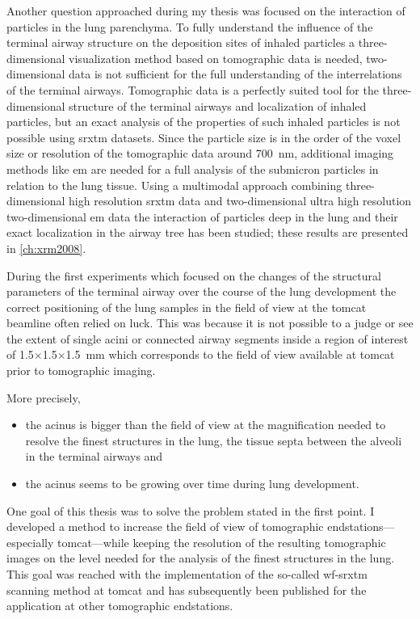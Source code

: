 Another question approached during my thesis was focused on the interaction of particles in the lung parenchyma. To fully understand the influence of the terminal airway structure on the deposition sites of inhaled particles a three-dimensional visualization method based on tomographic data is needed, two-dimensional data is not sufficient for the full understanding of the interrelations of the terminal airways. Tomographic data is a perfectly suited tool for the three-dimensional structure of the terminal airways and localization of inhaled particles, but an exact analysis of the properties of such inhaled particles is not possible using \ac{srxtm} datasets. Since the particle size is in the order of the voxel size or resolution of the tomographic data around \SI{700}{nm}, additional imaging methods like \ac{em} are needed for a full analysis of the submicron particles in relation to the lung tissue. Using a multimodal approach combining three-dimensional high resolution \ac{srxtm} data and two-dimensional ultra high resolution two-dimensional \ac{em} data the interaction of particles deep in the lung and their exact localization in the airway tree has been studied; these results are presented in \autoref{ch:xrm2008}.

During the first experiments which focused on the changes of the structural parameters of the terminal airway over the course of the lung development the correct positioning of the lung samples in the field of view at the \ac{tomcat} beamline often relied on luck. This was because it is not possible to a judge or see the extent of single acini or connected airway segments inside a region of interest of 1.5$\times$1.5$\times$\SI{1.5}{\milli\meter} which corresponds to the field of view available at \ac{tomcat} prior to tomographic imaging.

More precisely, 
\begin{itemize}
	\item the acinus is bigger than the field of view at the magnification needed to resolve the finest structures in the lung, the tissue septa between the alveoli in the terminal airways and
	\item the acinus seems to be growing over time during lung development.
\end{itemize}

One goal of this thesis was to solve the problem stated in the first point. I developed a method to increase the field of view of tomographic endstations---especially \ac{tomcat}---while keeping the resolution of the resulting tomographic images on the level needed for the analysis of the finest structures in the lung. This goal was reached with the implementation of the so-called \ac{wf-srxtm} scanning method at \ac{tomcat} and has subsequently been published for the application at other tomographic endstations.

